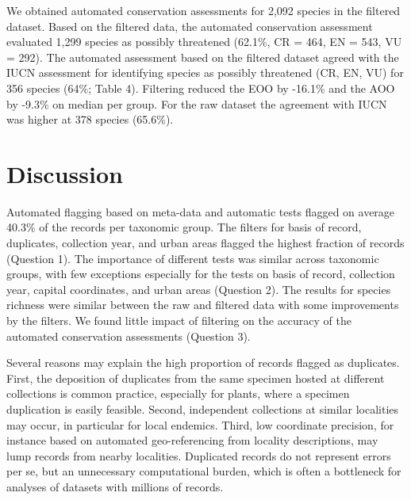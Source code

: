 \documentclass[
  12pt,
]{article}
\begin{document}
We obtained automated conservation assessments for 2,092 species in the filtered dataset. Based on the filtered data, the automated conservation assessment evaluated 1,299 species as possibly threatened (62.1\%, CR = 464, EN = 543, VU = 292). The automated assessment based on the filtered dataset agreed with the IUCN assessment for identifying species as possibly threatened (CR, EN, VU) for 356 species (64\%; Table 4). Filtering reduced the EOO by -16.1\% and the AOO by -9.3\% on median per group. For the raw dataset the agreement with IUCN was higher at 378 species (65.6\%).

\hypertarget{discussion}{%
\section{Discussion}\label{discussion}}

Automated flagging based on meta-data and automatic tests flagged on average 40.3\% of the records per taxonomic group. The filters for basis of record, duplicates, collection year, and urban areas flagged the highest fraction of records (Question 1). The importance of different tests was similar across taxonomic groups, with few exceptions especially for the tests on basis of record, collection year, capital coordinates, and urban areas (Question 2). The results for species richness were similar between the raw and filtered data with some improvements by the filters. We found little impact of filtering on the accuracy of the automated conservation assessments (Question 3).

Several reasons may explain the high proportion of records flagged as duplicates. First, the deposition of duplicates from the same specimen hosted at different collections is common practice, especially for plants, where a specimen duplication is easily feasible. Second, independent collections at similar localities may occur, in particular for local endemics. Third, low coordinate precision, for instance based on automated geo-referencing from locality descriptions, may lump records from nearby localities. Duplicated records do not represent errors per se, but an unnecessary computational burden, which is often a bottleneck for analyses of datasets with millions of records.
\end{document}
